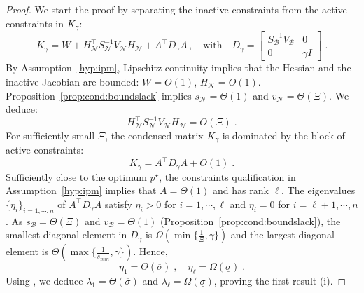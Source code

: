 \documentclass[smallextended]{svjour3}
\newcommand{\cactive}{\mathcal{B}}
\newcommand{\cinactive}{\mathcal{N}}
\begin{document}
\begin{proof}
  We start the proof by separating the inactive constraints from the active constraints in $K_\gamma$:
  \begin{equation}
    K_\gamma = W + H_{\cinactive}^\top S_{\cinactive}^{-1} V_{\cinactive} H_{\cinactive}
    + A^\top D_\gamma A \, ,
    \quad
    \text{with} \quad D_\gamma = \begin{bmatrix} S_{\cactive}^{-1} V_{\cactive} & 0 \\ 0 & \gamma I \end{bmatrix} \; .
  \end{equation}
  By Assumption~\ref{hyp:ipm}, Lipschitz
  continuity implies that the Hessian and the inactive Jacobian
  are bounded: $W = O(1)$, $H_{\cinactive} = O(1)$.
  Proposition~\ref{prop:cond:boundslack} implies
  $s_{\cinactive} = \Theta(1)$ and $v_{\cinactive} = \Theta(\Xi)$. We deduce:
  \begin{equation}
    \label{eq:cond:inactiveblock}
    H_{\cinactive}^\top S_{\cinactive}^{-1} V_{\cinactive} H_{\cinactive} = O(\Xi) \; .
  \end{equation}
  For sufficiently small $\Xi$,
  the condensed matrix $K_\gamma$ is dominated by the block of active constraints:
  \begin{equation}
    K_\gamma = A^\top D_\gamma A + O(1) \; .
  \end{equation}
  Sufficiently close to the optimum $p^\star$, the constraints qualification
  in Assumption~\ref{hyp:ipm} implies that $A = \Theta(1)$ and has rank $\ell$.
  The eigenvalues $\{\eta_i\}_{i =1,\cdots,n}$ of $A^\top D_\gamma A$
  satisfy $\eta_i > 0$ for $i = 1,\cdots,\ell$ and $\eta_i = 0$ for $i = \ell+1, \cdots, n$.
  As $s_{\cactive} = \Theta(\Xi)$ and $v_{\cactive} = \Theta(1)$
  (Proposition~\ref{prop:cond:boundslack}), the smallest diagonal
  element in $D_\gamma$ is $\Omega(\min\{\frac{1}{\Xi}, \gamma\})$
  and the largest diagonal element is $\Theta(\max\{\frac{1}{s_{min}}, \gamma\})$.
  Hence,
  \begin{equation}
    \eta_1 = \Theta(\overline{\sigma}) \; , \quad
    \eta_\ell = \Omega(\underline{\sigma}) \; .
  \end{equation}
  Using \cite[Lemma 3.1]{wright1998ill}, we deduce $\lambda_1 = \Theta(\overline{\sigma})$
  and $\lambda_\ell = \Omega(\underline{\sigma})$, proving the first result (i).


\end{proof}
\end{document}
